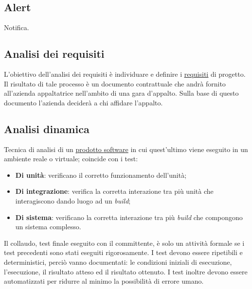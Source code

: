 	



\setcounter{secnumdepth}{0}
\usepackage{sectsty}
\sectionfont{\centering\fontsize{30}{30}\selectfont}



\copertina


\tableofcontents


	\newpage


	\subsection{Alert}
	\label{sec:alter}
	Notifica.

	\subsection{Analisi dei requisiti}
	\label{sec:analisirequisiti}
	L'obiettivo dell'analisi dei requisiti è individuare e definire i \underline{\hyperref[sec:requisito]{requisiti}} di progetto. Il risultato di tale processo è un documento contrattuale che andrà fornito all'azienda appaltatrice nell'ambito di una gara d'appalto. Sulla base di questo documento l'azienda deciderà a chi affidare l'appalto.

	\subsection{Analisi dinamica}
	\label{sec:analisidinamica}
	Tecnica di analisi di un \underline{\hyperref[sec:prodottosoftware]prodotto {software}} in cui quest'ultimo viene eseguito in un ambiente reale o virtuale; coincide con i test:
	\begin{itemize}
		\item \textbf{Di unità}: verificano il corretto funzionamento dell'unità;
		\item \textbf{Di integrazione}: verifica la corretta interazione tra più unità che interagiscono dando luogo ad un \emph{build};
		\item \textbf{Di sistema}: verificano la corretta interazione tra più \emph{build} che compongono un sistema complesso.
	\end{itemize}
	Il collaudo, test finale eseguito con il committente, è solo un attività formale se i test precedenti sono stati eseguiti rigorosamente. I test devono essere ripetibili e deterministici, perciò vanno documentati: le condizioni iniziali di esecuzione, l'esecuzione, il risultato atteso ed il risultato ottenuto. I test inoltre devono essere automatizzati per ridurre al minimo la possibilità di errore umano.

